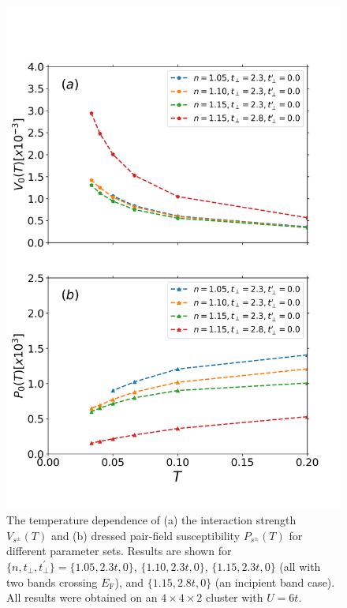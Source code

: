 \documentclass[prb,twocolumn,amsmath,amssymb,superscriptaddress,floatfix,nofootinbib]{revtex4-2}
\begin{document}
\begin{figure}[t]
\centering
\vspace{-0.75cm}
\includegraphics[scale=0.42]{V_vs_P_varyT.png}
\vspace{-0.75cm}
\caption{The temperature dependence of (a) the interaction strength $V_{s^\pm}(T)$ 
and (b) dressed pair-field susceptibility $P_{s^\pm}(T)$ for different parameter sets. Results are shown for  $\{n,t_\perp,t_\perp^\prime\} = \{1.05, 2.3t, 0\}$, $\{1.10,2.3t,0\}$, $\{1.15,2.3t,0\}$ (all with two bands crossing $E_\mathrm{F}$), and $\{1.15,2.8t,0\}$ (an incipient band case). All results were obtained on an $4\times 4\times 2$ cluster with $U = 6t$. 
}
\label{fig:separable_VandP}
\end{figure}
\end{document}

